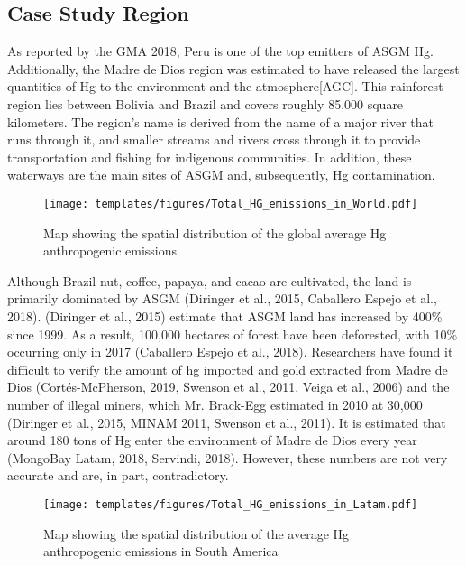 \subsection{Case Study Region}
\begin{flushleft}
As reported by the GMA 2018, Peru is one of the top emitters of ASGM Hg. Additionally, the Madre de Dios region was estimated to have released the largest quantities of Hg to the environment and the atmosphere[AGC]. This rainforest region lies between Bolivia and Brazil and covers roughly 85,000 square kilometers. The region's name is derived from the name of a major river that runs through it, and smaller streams and rivers cross through it to provide transportation and fishing for indigenous communities. In addition, these waterways are the main sites of ASGM and, subsequently, Hg contamination. 
\end{flushleft}
\begin{figure}[H]
  \texttt{[image: templates/figures/Total\_HG\_emissions\_in\_World.pdf]}
  \centering
  \caption{Map showing the spatial distribution of the global average Hg anthropogenic emissions}
  \label{fig:World_Hg_em}
\end{figure}
\FloatBarrier
\begin{flushleft}
Although Brazil nut, coffee, papaya, and cacao are cultivated, the land is primarily dominated by ASGM (Diringer et al., 2015, Caballero Espejo et al., 2018). (Diringer et al., 2015) estimate that ASGM land has increased by 400\% since 1999. As a result, 100,000 hectares of forest have been deforested, with 10\% occurring only in 2017 (Caballero Espejo et al., 2018). Researchers have found it difficult to verify the amount of hg imported and gold extracted from Madre de Dios (Cortés-McPherson, 2019, Swenson et al., 2011, Veiga et al., 2006) and the number of illegal miners, which Mr. Brack-Egg estimated in 2010 at 30,000 (Diringer et al., 2015, MINAM 2011, Swenson et al., 2011). It is estimated that around 180 tons of Hg enter the environment of Madre de Dios every year (MongoBay Latam, 2018, Servindi, 2018). However, these numbers are not very accurate and are, in part, contradictory. 
\end{flushleft}
\begin{figure}[H]
  \texttt{[image: templates/figures/Total\_HG\_emissions\_in\_Latam.pdf]}
  \centering
  \caption{Map showing the spatial distribution of the average Hg anthropogenic emissions in South America}
  \label{fig:Latam_Hg_em}
\end{figure}
\FloatBarrier

